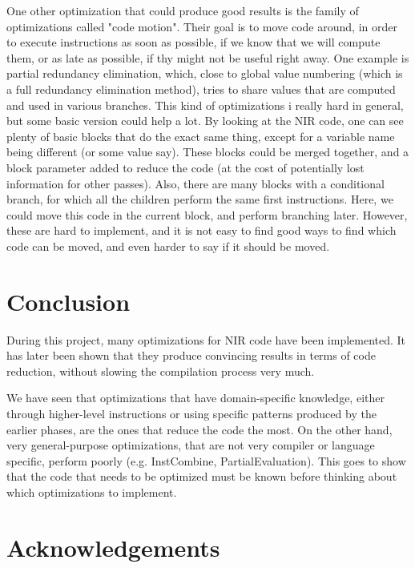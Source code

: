 \documentclass[12pt,a4paper]{article}
\newcommand{\scala}[1]{\textsf{#1}}
\begin{document}
One other optimization that could produce good results is the family of optimizations called "code motion". Their goal is to move code around, in order to execute instructions as soon as possible, if we know that we will compute them, or as late as possible, if thy might not be useful right away. One example is partial redundancy elimination, which, close to global value numbering (which is a full redundancy elimination method), tries to share values that are computed and used in various branches. This kind of optimizations i really hard in general, but some basic version could help a lot. By looking at the NIR code, one can see plenty of basic blocks that do the exact same thing, except for a variable name being different (or some value say). These blocks could be merged together, and a block parameter added to reduce the code (at the cost of potentially lost information for other passes). Also, there are many blocks with a conditional branch, for which all the children perform the same first instructions. Here, we could move this code in the current block, and perform branching later. However, these are hard to implement, and it is not easy to find good ways to find which code can be moved, and even harder to say if it should be moved.


\section{Conclusion}

During this project, many optimizations for NIR code have been implemented. It has later been shown that they produce convincing results in terms of code reduction, without slowing the compilation process very much.

We have seen that optimizations that have domain-specific knowledge, either through higher-level instructions or using specific patterns produced by the earlier phases, are the ones that reduce the code the most. On the other hand, very general-purpose optimizations, that are not very compiler or language specific, perform poorly (e.g. \scala{InstCombine}, \scala{PartialEvaluation}). This goes to show that the code that needs to be optimized must be known before thinking about which optimizations to implement.

\section*{Acknowledgements}
\end{document}
